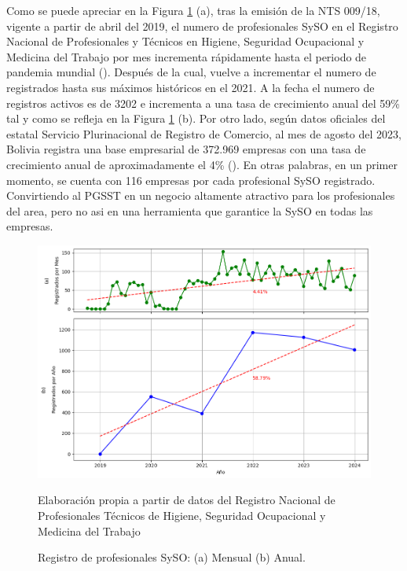 Como se puede apreciar en la Figura \ref{fig:profesionales_syso_registrados} (a), tras la emisión de la NTS 009/18, vigente a partir de abril del 2019, el numero de profesionales SySO en el Registro Nacional de Profesionales y Técnicos en Higiene, Seguridad Ocupacional y Medicina del Trabajo por mes incrementa rápidamente hasta el periodo de pandemia mundial (\cite{platto2021history}). Después de la cual, vuelve a incrementar el numero de registrados hasta sus máximos históricos en el 2021. A la fecha el numero de registros activos es de 3202 e incrementa a una tasa de crecimiento anual del 59\% tal y como se refleja en la Figura \ref{fig:profesionales_syso_registrados} (b). Por otro lado, según datos oficiales del estatal Servicio Plurinacional de Registro de Comercio, al mes de agosto del 2023, Bolivia registra una base empresarial de 372.969 empresas con una tasa de crecimiento anual de aproximadamente el 4\% (\cite{ministeriodesarrollo2024}). En otras palabras, en un primer momento, se cuenta con 116 empresas por cada profesional SySO registrado. Convirtiendo al PGSST en un negocio altamente atractivo para los profesionales del area, pero no asi en una herramienta que garantice la SySO en todas las empresas.

\begin{figure}[htb]
	\centering
	\includegraphics[width=\textwidth]{images/marcoref/tendencia_profesionales_syso_registrados.png}
	\caption{Registro de profesionales SySO: (a) Mensual (b) Anual.} \vspace{-0.2cm}
	\footnotesize{Elaboración propia a partir de datos del Registro Nacional de Profesionales Técnicos de Higiene, Seguridad Ocupacional y Medicina del Trabajo}
	\label{fig:profesionales_syso_registrados} 
\end{figure}

